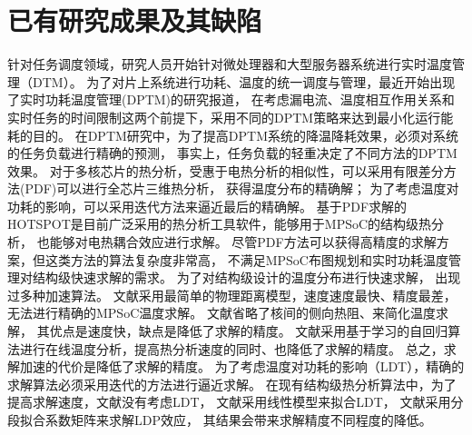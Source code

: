 \section{已有研究成果及其缺陷}
针对任务调度领域，研究人员开始针对微处理器和大型服务器系统进行实时温度管理（DTM）。 为了对片上系统进行功耗、温度的统一调度与管理，最近开始出现了实时功耗温度管理(DPTM)的研究报道， 在考虑漏电流、温度相互作用关系和实时任务的时间限制这两个前提下，采用不同的DPTM策略来达到最小化运行能耗的目的。
在DPTM研究中，为了提高DPTM系统的降温降耗效果，必须对系统的任务负载进行精确的预测， 事实上，任务负载的轻重决定了不同方法的DPTM效果。
对于多核芯片的热分析，受惠于电热分析的相似性，可以采用有限差分方法(PDF)可以进行全芯片三维热分析， 获得温度分布的精确解； 为了考虑温度对功耗的影响，可以采用迭代方法来逼近最后的精确解。 基于PDF求解的HOTSPOT是目前广泛采用的热分析工具软件，能够用于MPSoC的结构级热分析， 也能够对电热耦合效应进行求解。 尽管PDF方法可以获得高精度的求解方案，但这类方法的算法复杂度非常高， 不满足MPSoC布图规划和实时功耗温度管理对结构级快速求解的需求。
为了对结构级设计的温度分布进行快速求解， 出现过多种加速算法。 文献采用最简单的物理距离模型，速度速度最快、精度最差，无法进行精确的MPSoC温度求解。 文献省略了核间的侧向热阻、来简化温度求解， 其优点是速度快，缺点是降低了求解的精度。 文献采用基于学习的自回归算法进行在线温度分析，提高热分析速度的同时、也降低了求解的精度。 总之，求解加速的代价是降低了求解的精度。
为了考虑温度对功耗的影响（LDT），精确的求解算法必须采用迭代的方法进行逼近求解。 在现有结构级热分析算法中，为了提高求解速度，文献没有考虑LDT， 文献采用线性模型来拟合LDT， 文献采用分段拟合系数矩阵来求解LDP效应， 其结果会带来求解精度不同程度的降低。

